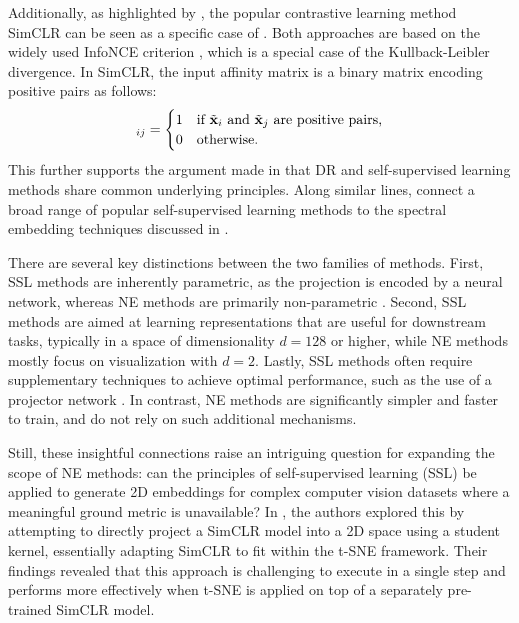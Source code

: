 Additionally, as highlighted by \citet{hu2022your}, the popular contrastive learning method SimCLR \citep{chen2020simple} can be seen as a specific case of . Both approaches are based on the widely used InfoNCE criterion \citep{oord2018representation}, which is a special case of the Kullback-Leibler divergence. In SimCLR, the input affinity matrix is a binary matrix encoding positive pairs as follows:
\begin{align}
[\widetilde{\simiX}]_{ij} = 
\begin{cases}
1 & \text{if } \tilde{\vx}_i \text{ and } \tilde{\vx}_j \text{ are positive pairs,} \\
0 & \text{otherwise.}
\end{cases}
\end{align}
This further supports the argument made in  that DR and self-supervised learning methods share common underlying principles. Along similar lines, \citet{balestriero2022contrastive} connect a broad range of popular self-supervised learning methods to the spectral embedding techniques discussed in .

There are several key distinctions between the two families of methods. First, SSL methods are inherently parametric, as the projection is encoded by a neural network, whereas NE methods are primarily non-parametric \citep{chen2020simple}. Second, SSL methods are aimed at learning representations that are useful for downstream tasks, typically in a space of dimensionality $d=128$ or higher, while NE methods mostly focus on visualization with $d=2$. Lastly, SSL methods often require supplementary techniques to achieve optimal performance, such as the use of a projector network \citep{balestriero2023cookbookselfsupervisedlearning}. In contrast, NE methods are significantly simpler and faster to train, and do not rely on such additional mechanisms.

Still, these insightful connections raise an intriguing question for expanding the scope of NE methods: can the principles of self-supervised learning (SSL) be applied to generate 2D embeddings for complex computer vision datasets where a meaningful ground metric is unavailable? In \citep{bohm2022unsupervised}, the authors explored this by attempting to directly project a SimCLR model into a 2D space using a student kernel, essentially adapting SimCLR to fit within the t-SNE framework. Their findings revealed that this approach is challenging to execute in a single step and performs more effectively when t-SNE is applied on top of a separately pre-trained SimCLR model.

